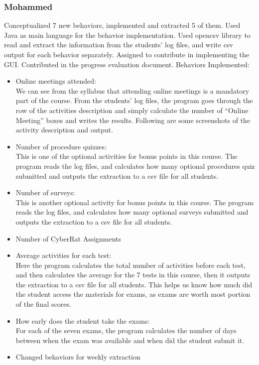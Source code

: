 \documentclass[12pt]{article}
\begin{document}
	\subsubsection{Mohammed}
Conceptualized 7 new behaviors, implemented and extracted 5 of them. Used Java as main language for the behavior implementation. Used opencsv library to read and extract the information from the students’ log files, and write csv output for each behavior separately. Assigned to contribute in implementing the GUI. Contributed in the progress evaluation document.
Behaviors Implemented:
\begin{itemize}
\item Online meetings attended: \\
We can see from the syllabus that attending online meetings is a mandatory part of the course. From the students’ log files, the program goes through the row of the activities description and simply calculate the number of “Online Meeting” boxes and writes the results. Following are some screenshots of the activity description and output.
\item Number of procedure quizzes: \\
This is one of the optional activities for bonus points in this course. The program reads the log files, and calculates how many optional procedures quiz submitted and outputs the extraction to a csv file for all students.
\item Number of surveys: \\
This is another optional activity for bonus points in this course. The program reads the log files, and calculates how many optional surveys submitted and outputs the extraction to a csv file for all students.
\item Number of CyberRat Assignments \\
\item Average activities for each test: \\
Here the program calculates the total number of activities before each test, and then calculates the average for the 7 tests in this course, then it outputs the extraction to a csv file for all students. This helps us know how much did the student access the materials for exams, as exams are worth most portion of the final scores.
\item How early does the student take the exams: \\
For each of the seven exams, the program calculates the number of days between when the exam was available and when did the student submit it.
\item Changed behaviors for weekly extraction
\end{itemize}
\end{document}
